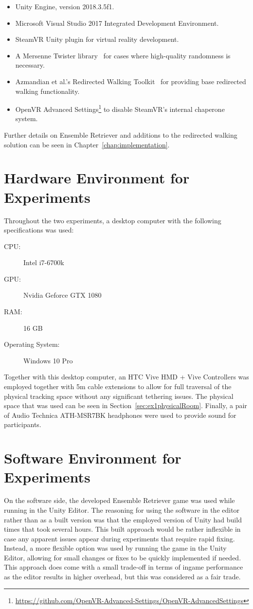 \begin{itemize}
    \item Unity Engine, version 2018.3.5f1.
    \item Microsoft Visual Studio 2017 Integrated Development Environment.
    \item SteamVR Unity plugin for virtual reality development.
    \item A Mersenne Twister library~\cite{MersenneTwisterLibraryLink} for cases where high-quality randomness is necessary.
    \item Azmandian et al.'s Redirected Walking Toolkit~\cite{azmandian2016redirected} for providing base redirected walking functionality.
    \item OpenVR Advanced Settings\footnote{\url{https://github.com/OpenVR-Advanced-Settings/OpenVR-AdvancedSettings}} to disable SteamVR's internal chaperone system.
\end{itemize}

Further details on Ensemble Retriever and additions to the redirected walking solution can be seen in Chapter~\ref{chap:implementation}.

\section{Hardware Environment for Experiments}
Throughout the two experiments, a desktop computer with the following specifications was used:
\begin{description}
   \item[CPU:] Intel i7-6700k
   \item[GPU:] Nvidia Geforce GTX 1080
   \item[RAM:] 16 GB
   \item[Operating System:] Windows 10 Pro
\end{description}

Together with this desktop computer, an HTC Vive HMD + Vive Controllers was employed together with 5m cable extensions to allow for full traversal of the physical tracking space without any significant tethering issues. The physical space that was used can be seen in Section~\ref{sec:ex1physicalRoom}. Finally, a pair of Audio Technica ATH-MSR7BK headphones were used to provide sound for participants. 

\section{Software Environment for Experiments}
On the software side, the developed Ensemble Retriever game was used while running in the Unity Editor. The reasoning for using the software in the editor rather than as a built version was that the employed version of Unity had build times that took several hours. This built approach would be rather inflexible in case any apparent issues appear during experiments that require rapid fixing. Instead, a more flexible option was used by running the game in the Unity Editor, allowing for small changes or fixes to be quickly implemented if needed. This approach does come with a small trade-off in terms of ingame performance as the editor results in higher overhead, but this was considered as a fair trade. 
